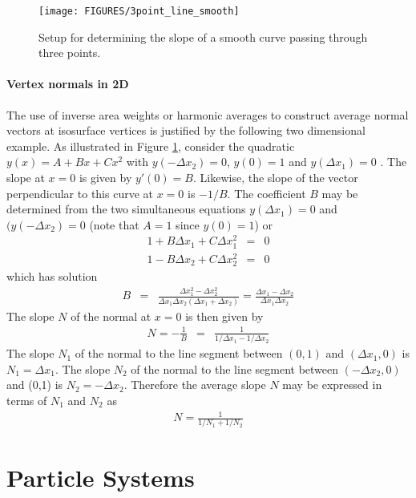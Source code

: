 \documentclass[11pt,twoside]{book}
\begin{document}
%
%

\begin{figure}[\figoptions]
\begin{center}
\texttt{[image: FIGURES/3point\_line\_smooth]}
\end{center}
\caption{Setup for determining the slope of a smooth curve passing through three points.}
\label{figlinesmooth}%
\end{figure}

\paragraph{Vertex normals in 2D} The use of inverse area weights or harmonic averages to construct average normal vectors at isosurface vertices is justified by the following two dimensional example.  As illustrated in Figure \ref{figlinesmooth}, consider the quadratic $y(x)=A+Bx+Cx^2$ with $y(-\Delta x_2)=0$, $y(0)=1$ and $y(\Delta x_1)=0$ .  The slope at $x=0$ is given by $y'(0)=B$.  Likewise, the slope of the vector perpendicular to this curve at $x=0$ is $-1/B$.  The coefficient $B$ may be determined from the two simultaneous equations $y(\Delta x_1)=0$ and  $(y(-\Delta x_2)=0$ (note that $A=1$ since $y(0)=1$) or
\begin{eqnarray}
1+B\Delta x_1 + C \Delta x_1^2 &= &0\\
1-B\Delta x_2 + C \Delta x_2^2 &= &0
\end{eqnarray}
which has solution
\begin{eqnarray}
B&=&\frac{\Delta x_1^2-\Delta x_2^2}{\Delta x_1\Delta x_2(\Delta x_1+\Delta x_2)}=
\frac{\Delta x_1-\Delta x_2}{\Delta x_1\Delta x_2}
\end{eqnarray}
The slope $N$ of the normal at $x=0$ is then given by
\begin{eqnarray}
N=-\frac{1}{B}&=&\frac{1}{1/\Delta x_1-1/\Delta x_2}
\end{eqnarray}
The slope $N_1$ of the normal to the line segment between $(0,1)$ and $(\Delta x_1,0)$ is $N_1=\Delta x_1$.
The slope $N_2$ of the normal to the line segment between $(-\Delta x_2,0)$ and (0,1) is $N_2=-\Delta x_2$.
Therefore the average slope $N$ may be expressed in terms of $N_1$ and $N_2$ as
\begin{eqnarray}
N=\frac{1}{1/N_1+1/N_2}
\end{eqnarray}

\section{Particle Systems}
\end{document}
